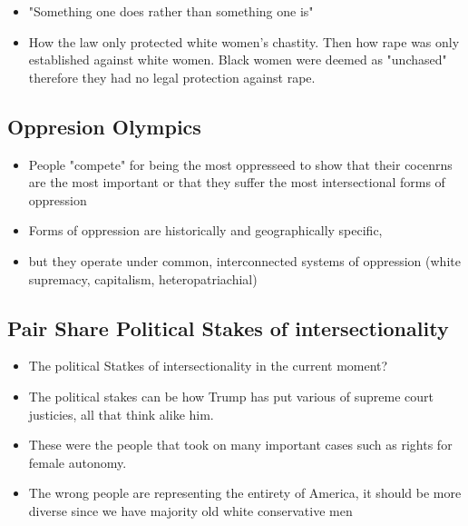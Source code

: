 \documentclass{article}
\begin{document}
\begin{itemize}
  \item "Something one does rather than something one is"
  \item How the law only protected white women's chastity.
    Then how rape was only established against white women. 
    Black women were deemed as "unchased" therefore they had no legal protection against rape.
\end{itemize}

\subsection{Oppresion Olympics}
\begin{itemize}
  \item People "compete" for being the most oppresseed to show 
    that their cocenrns are the most important
    or that they suffer the most intersectional forms of oppression
  \item Forms of oppression are historically 
    and geographically specific, 
  \item but they operate under common, 
    interconnected systems of oppression
    (white supremacy, capitalism, heteropatriachial)
\end{itemize}

\subsection{Pair Share Political Stakes of intersectionality}
\begin{itemize}
  \item The political Statkes of intersectionality in the current moment?
  \item The political stakes can be how Trump has put various of supreme court justicies, all that think alike him.
  \item These were the people that took on many important cases such as rights for female autonomy.
  \item The wrong people are representing the entirety of America, it should be more 
    diverse since we have majority old white conservative men
\end{itemize}
\end{document}
